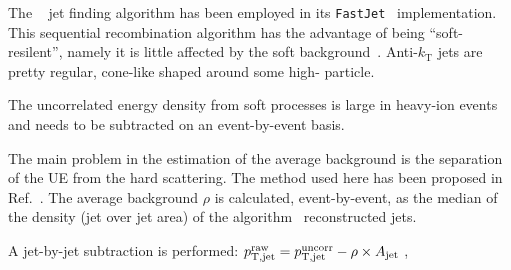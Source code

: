 \documentclass[a4paper]{jpconf}
\begin{document}
The \antikt{}~\cite{antikt-cacciari-08} jet finding algorithm has been employed in its \texttt{FastJet}~\cite{fastjet-cacciari-11} 
implementation. This sequential recombination algorithm has the advantage of
being ``soft-resilent'', namely it is little affected by the soft background~\cite{jet-cacciari-11}. Anti-$k_\mathrm{T}$ jets are pretty regular, 
cone-like shaped around some high-\pT{} particle. 

The uncorrelated energy density from soft processes is large in heavy-ion events and needs to be subtracted 
on an event-by-event basis. 

The main problem in the estimation of the average background is the separation of the UE from the hard scattering.
The method used here has been proposed in Ref.~\cite{bkg-cacciari-08}.
The average background $\rho$ is calculated, event-by-event, as the median of the \pT{}
density (jet \pT{} over jet area) of the \kt{} algorithm~\cite{kt-ellis-93} reconstructed jets.

A jet-by-jet subtraction is performed:
$p_{\rm T,jet}^{\rm raw}=p_{\rm T,jet}^{\rm uncorr}-\rho \times A_{\rm jet}$ ,
\end{document}
